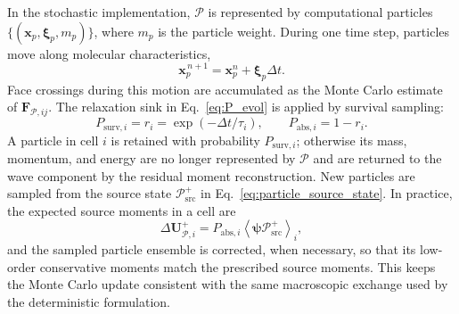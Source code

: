 \documentclass[preprint,12pt]{elsarticle}
\begin{document}
In the stochastic implementation, $\mathcal{P}$ is represented by computational particles $\{(\boldsymbol{x}_p,\boldsymbol{\xi}_p,m_p)\}$, where $m_p$ is the particle weight. During one time step, particles move along molecular characteristics,
\begin{equation}\label{eq:mc_streaming}
    \boldsymbol{x}_p^{\,n+1}=\boldsymbol{x}_p^n+\boldsymbol{\xi}_p\Delta t .
\end{equation}
Face crossings during this motion are accumulated as the Monte Carlo estimate of $\mathbf F_{\mathcal{P},ij}$. The relaxation sink in Eq.~\eqref{eq:P_evol} is applied by survival sampling:
\begin{equation}\label{eq:mc_survival}
    P_{\mathrm{surv},i}=r_i=\exp(-\Delta t/\tau_i),
    \qquad
    P_{\mathrm{abs},i}=1-r_i .
\end{equation}
A particle in cell $i$ is retained with probability $P_{\mathrm{surv},i}$; otherwise its mass, momentum, and energy are no longer represented by $\mathcal{P}$ and are returned to the wave component by the residual moment reconstruction. New particles are sampled from the source state $\mathcal{P}_{\mathrm{src}}^{+}$ in Eq.~\eqref{eq:particle_source_state}. In practice, the expected source moments in a cell are
\begin{equation}\label{eq:mc_source_moment}
    \Delta \mathbf U_{\mathcal{P},i}^{+}
    =
    P_{\mathrm{abs},i}
    \left\langle \boldsymbol{\psi}\mathcal{P}_{\mathrm{src}}^{+} \right\rangle_i,
\end{equation}
and the sampled particle ensemble is corrected, when necessary, so that its low-order conservative moments match the prescribed source moments. This keeps the Monte Carlo update consistent with the same macroscopic exchange used by the deterministic formulation.
\end{document}
